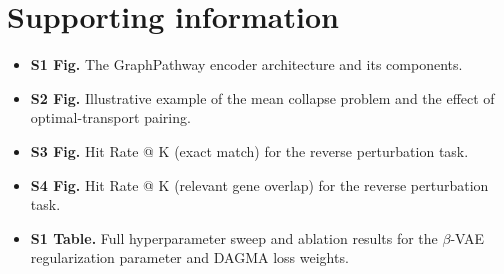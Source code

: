 \documentclass[10pt,letterpaper]{article}
\theoremstyle{definition}
\theoremstyle{remark}
\begin{document}
\nolinenumbers







\section*{Supporting information}
\begin{itemize}
\item \textbf{S1 Fig.} The GraphPathway encoder architecture and its components.
\item \textbf{S2 Fig.} Illustrative example of the mean collapse problem and the effect of optimal-transport pairing.
\item \textbf{S3 Fig.} Hit Rate @ K (exact match) for the reverse perturbation task.
\item \textbf{S4 Fig.} Hit Rate @ K (relevant gene overlap) for the reverse perturbation task.
\item \textbf{S1 Table.} Full hyperparameter sweep and ablation results for the $\beta$-VAE regularization parameter and DAGMA loss weights.
\end{itemize}


\end{document}
